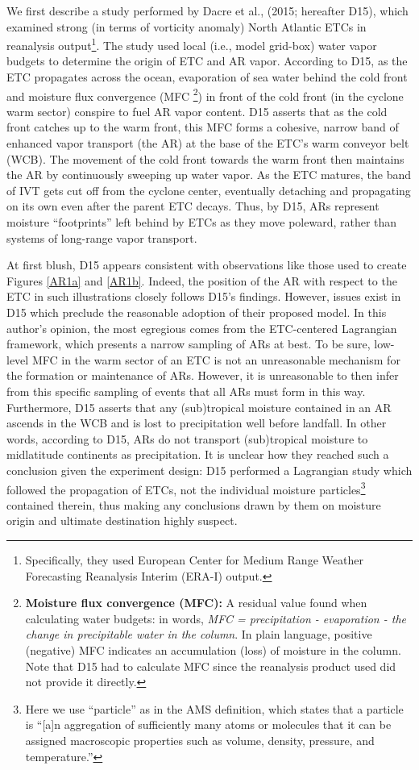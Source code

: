 \documentclass[letterpaper,12pt]{article}
\begin{document}
We first describe a study performed by Dacre et al., (2015; hereafter D15), which examined strong (in terms of vorticity anomaly) North Atlantic ETCs in reanalysis output\footnote{Specifically, they used European Center for Medium Range Weather Forecasting Reanalysis Interim (ERA-I) output.}. The study used local (i.e., model grid-box) water vapor budgets to determine the origin of ETC and AR vapor. According to D15, as the ETC propagates across the ocean, evaporation of sea water behind the cold front and moisture flux convergence (MFC \footnote{\textbf{Moisture flux convergence (MFC):} A residual value found when calculating water budgets: in words, \textit{MFC = precipitation - evaporation - the change in precipitable water in the column}. In plain language, positive (negative) MFC indicates an accumulation (loss) of moisture in the column. Note that D15 had to calculate MFC since the reanalysis product used did not provide it directly.}) in front of the cold front (in the cyclone warm sector) conspire to fuel AR vapor content. D15 asserts that as the cold front catches up to the warm front, this MFC forms a cohesive, narrow band of enhanced vapor transport (the AR) at the base of the ETC's warm conveyor belt (WCB). The movement of the cold front towards the warm front then maintains the AR by continuously sweeping up water vapor. As the ETC matures, the band of IVT gets cut off from the cyclone center, eventually detaching and propagating on its own even after the parent ETC decays. Thus, by D15, ARs represent moisture ``footprints'' left behind by ETCs as they move poleward, rather than systems of long-range vapor transport.

At first blush, D15 appears consistent with observations like those used to create Figures \ref{AR1a} and \ref{AR1b}. Indeed, the position of the AR with respect to the ETC in such illustrations closely follows D15's findings. However, issues exist in D15 which preclude the reasonable adoption of their proposed model. In this author's opinion, the most egregious comes from the ETC-centered Lagrangian framework, which presents a narrow sampling of ARs at best. To be sure, low-level MFC in the warm sector of an ETC is not an unreasonable mechanism for the formation or maintenance of ARs. However, it is unreasonable to then infer from this specific sampling of events that all ARs must form in this way. Furthermore, D15 asserts that any (sub)tropical moisture contained in an AR ascends in the WCB and is lost to precipitation well before landfall. In other words, according to D15, ARs do not transport (sub)tropical moisture to midlatitude continents as precipitation. It is unclear how they reached such a conclusion given the experiment design: D15 performed a Lagrangian study which followed the propagation of ETCs, not the individual moisture particles\footnote{Here we use ``particle'' as in the AMS definition, which states that a particle is ``[a]n aggregation of sufficiently many atoms or molecules that it can be assigned macroscopic properties such as volume, density, pressure, and temperature.''} contained therein, thus making any conclusions drawn by them on moisture origin and ultimate destination highly suspect.
\end{document}
